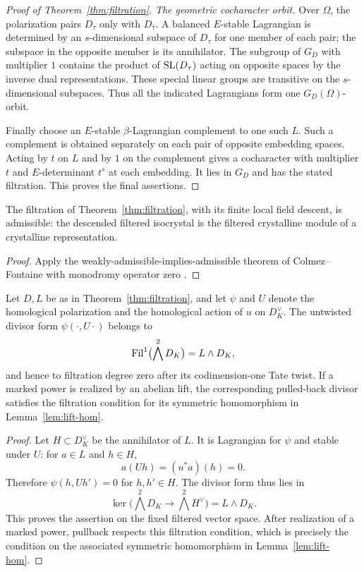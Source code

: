 \begin{proof}[Proof of Theorem~\ref{thm:filtration}]
\medskip\noindent
\emph{The geometric cocharacter orbit.}
Over $\Omega$, the polarization pairs $D_\tau$ only with
$D_{\bar\tau}$.  A balanced $E$-stable Lagrangian is determined by an
$s$-dimensional subspace of $D_\tau$ for one member of each pair;
the subspace in the opposite member is its annihilator.  The
subgroup of $G_D$ with multiplier $1$ contains the product of
$\operatorname{SL}(D_\tau)$ acting on opposite spaces by the inverse dual
representations.  These special linear groups are transitive on
the $s$-dimensional subspaces.  Thus all the indicated Lagrangians
form one $G_D(\Omega)$-orbit.

Finally choose an $E$-stable $\beta$-Lagrangian complement to one
such $L$.  Such a complement is obtained separately on each pair
of opposite embedding spaces.  Acting by $t$ on $L$ and by $1$
on the complement gives a cocharacter with multiplier $t$ and
$E$-determinant $t^s$ at each embedding.  It lies in $G_D$ and has
the stated filtration.  This proves the final assertions.
\end{proof}

\begin{corollary}
\label{cor:filtration-admissible}
The filtration of Theorem~\ref{thm:filtration}, with its finite local
field descent, is admissible: the descended filtered isocrystal is
the filtered crystalline module of a crystalline representation.
\end{corollary}

\begin{proof}
Apply the weakly-admissible-implies-admissible theorem of
Colmez--Fontaine with monodromy operator zero
\cite[Theorem~A]{ColmezFontaine2000}.
\end{proof}

\begin{corollary}
\label{cor:filtration-divisor}
Let \(D,L\) be as in Theorem~\ref{thm:filtration}, and let \(\psi\)
and \(U\) denote the homological polarization and the homological
action of \(u\) on \(D_K^\vee\). The untwisted divisor form
\(\psi(\cdot,U\cdot)\) belongs to
\[
 \operatorname{Fil}^1\bigl(\bigwedge^2D_K\bigr)=L\wedge D_K,
\]
and hence to filtration degree zero after its codimension-one Tate
twist. If a marked power is realized by an abelian lift, the
corresponding pulled-back divisor satisfies the filtration condition
for its symmetric homomorphism in Lemma~\ref{lem:lift-hom}.
\end{corollary}

\begin{proof}
Let \(H\subset D_K^\vee\) be the annihilator of \(L\). It is
Lagrangian for \(\psi\) and stable under \(U\): for \(a\in L\)
and \(h\in H\),
\[
 a(Uh)=(u^*a)(h)=0.
\]
Therefore \(\psi(h,Uh')=0\) for \(h,h'\in H\). The divisor form
thus lies in
\[
 \ker\bigl(\bigwedge^2D_K\longrightarrow\bigwedge^2H^\vee\bigr)
       =L\wedge D_K.
\]
This proves the assertion on the fixed filtered vector space. After
realization of a marked power, pullback respects this filtration
condition, which is precisely the condition on the associated
symmetric homomorphism in Lemma~\ref{lem:lift-hom}.
\end{proof}
